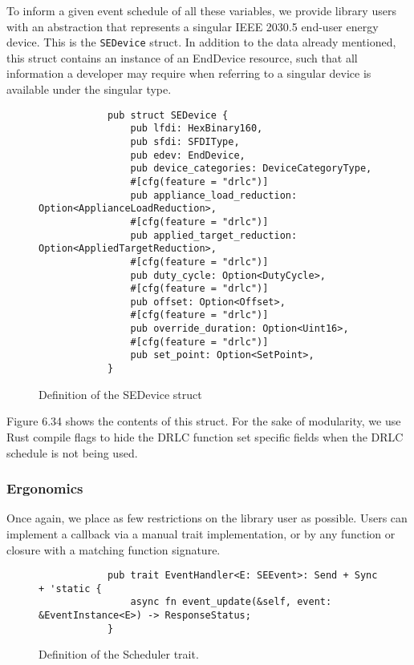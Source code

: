 To inform a given event schedule of all these variables, we provide library users with an abstraction that represents a singular IEEE 2030.5 end-user energy device. This is the \texttt{SEDevice} struct.
In addition to the data already mentioned, this struct contains an instance of an EndDevice resource, such that all information a developer may require when referring to a singular device is available under the singular type.

\begin{figure}[h]
    \begin{center}
        \begin{lstlisting}
            pub struct SEDevice {
                pub lfdi: HexBinary160,
                pub sfdi: SFDIType,
                pub edev: EndDevice,
                pub device_categories: DeviceCategoryType,
                #[cfg(feature = "drlc")]
                pub appliance_load_reduction: Option<ApplianceLoadReduction>,
                #[cfg(feature = "drlc")]
                pub applied_target_reduction: Option<AppliedTargetReduction>,
                #[cfg(feature = "drlc")]
                pub duty_cycle: Option<DutyCycle>,
                #[cfg(feature = "drlc")]
                pub offset: Option<Offset>,
                #[cfg(feature = "drlc")]
                pub override_duration: Option<Uint16>,
                #[cfg(feature = "drlc")]
                pub set_point: Option<SetPoint>,
            }
        \end{lstlisting}
        \label{fig:sedevicestruct}
        \vspace{-10pt}
        \caption{Definition of the SEDevice struct}
    \end{center}
\end{figure}

Figure 6.34 shows the contents of this struct. For the sake of modularity, we use Rust compile flags to hide the DRLC function set specific fields when the DRLC schedule is not being used. 

\subsubsection{Ergonomics}
Once again, we place as few restrictions on the library user as possible. Users can implement a callback via a manual trait implementation, or by any function or closure with a matching function signature.

\begin{figure}[h]
    \begin{center}
        \begin{lstlisting}
            pub trait EventHandler<E: SEEvent>: Send + Sync + 'static {
                async fn event_update(&self, event: &EventInstance<E>) -> ResponseStatus;
            }
        \end{lstlisting}
        \label{fig:eventhandlertrait}
        \vspace{-10pt}
        \caption{Definition of the Scheduler trait.}
    \end{center}
\end{figure}

